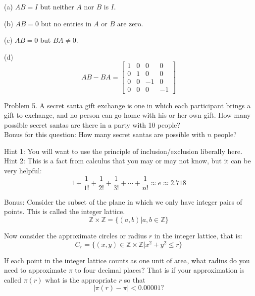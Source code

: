 \documentclass[16 pt]{amsart}
\theoremstyle{definition}
\theoremstyle{remark}
\numberwithin{equation}{subsection}
\newcommand{\Z}{\mathbb{Z}}
\begin{document}
\vspace{.25in}

(a) $AB = I$ but neither $A$ nor $B$ is $I$.

\vspace{.25in}

(b) $AB = 0$ but no entries in $A$ or $B$ are zero.

\vspace{.25in}

(c) $AB=0$ but $BA \ne 0$.

\vspace{.25in}

(d) 
\[
AB - BA = \begin{bmatrix}
1 & 0 & 0 & 0\\
0 & 1 & 0 & 0\\
0 & 0 & -1 & 0\\
0 & 0 & 0 & -1
\end{bmatrix}
\]

\newpage

Problem 5. A secret santa gift exchange is one in which each participant brings a gift to exchange, and no person can go home with his or her own gift. How many possible secret santas are there in a party with 10 people?\\
Bonus for this question:  How many secret santas are possible with $n$ people?  

\vspace{.25in}

Hint 1: You will want to use the principle of inclusion/exclusion liberally here.\\
Hint 2: This is a fact from calculus that you may or may not know, but it can be very helpful:
\[
1 + \frac{1}{1!} + \frac{1}{2!} + \frac{1}{3!} + \cdots + \frac{1}{n!} \approx e \approx 2.718
\]


\newpage

Bonus: Consider the subset of the plane in which we only have integer pairs of points.  This is called the integer lattice.
\[
\Z \times \Z = \{(a,b) | a,b\in\Z \}
\]

Now consider the approximate circles or radius $r$ in the integer lattice, that is:
\[
C_r = \{(x,y)\in \Z\times\Z | x^2+y^2 \le r\}
\]

If each point in the integer lattice counts as one unit of area, what radius do you need to approximate $\pi$ to four decimal places?  That is if your approximation is called $\pi(r)$ what is the appropriate $r$ so that
\[
|\pi(r) - \pi | < 0.00001?
\]
\end{document}
